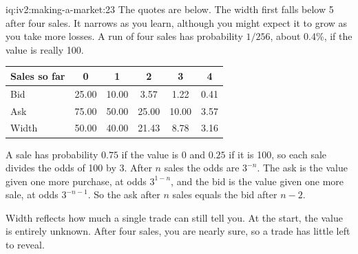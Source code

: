 \begin{solution}{iq:iv2:making-a-market:23}
The quotes are below. The width first falls below 5 after four sales. It narrows as you learn, although you might expect it to grow as you take more losses. A run of four sales has probability $1/256$, about 0.4\%, if the value is really 100.
\begin{center}\small
\begin{tabular}{@{}lccccc@{}}
Sales so far & 0 & 1 & 2 & 3 & 4 \\ \hline
Bid & 25.00 & 10.00 & 3.57 & 1.22 & 0.41 \\
Ask & 75.00 & 50.00 & 25.00 & 10.00 & 3.57 \\
Width & 50.00 & 40.00 & 21.43 & 8.78 & 3.16
\end{tabular}
\end{center}

A sale has probability $0.75$ if the value is 0 and $0.25$ if it is 100, so each sale divides the odds of 100 by 3. After $n$ sales the odds are $3^{-n}$. The ask is the value given one more purchase, at odds $3^{1-n}$, and the bid is the value given one more sale, at odds $3^{-n-1}$. So the ask after $n$ sales equals the bid after $n - 2$.

Width reflects how much a single trade can still tell you. At the start, the value is entirely unknown. After four sales, you are nearly sure, so a trade has little left to reveal.

\end{solution}

